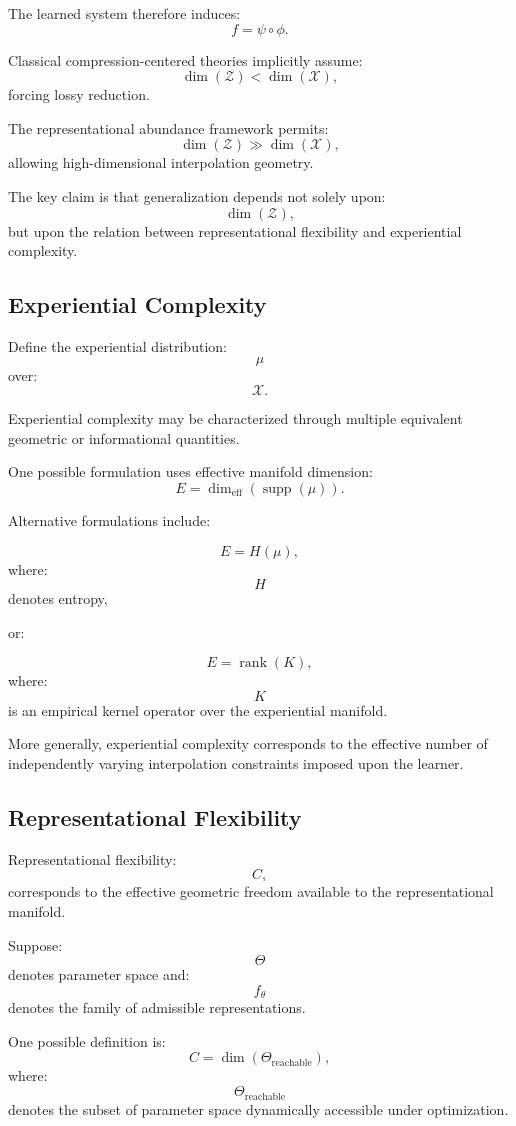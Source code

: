 \documentclass[12pt,a4paper]{article}
\begin{document}
The learned system therefore induces:
\[
f
=
\psi \circ \phi.
\]

Classical compression-centered theories implicitly assume:
\[
\dim(\mathcal{Z})
<
\dim(\mathcal{X}),
\]
forcing lossy reduction.

The representational abundance framework permits:
\[
\dim(\mathcal{Z})
\gg
\dim(\mathcal{X}),
\]
allowing high-dimensional interpolation geometry.

The key claim is that generalization depends not solely upon:
\[
\dim(\mathcal{Z}),
\]
but upon the relation between representational flexibility and experiential complexity.

\subsection{Experiential Complexity}

Define the experiential distribution:
\[
\mu
\]
over:
\[
\mathcal{X}.
\]

Experiential complexity may be characterized through multiple equivalent geometric or informational quantities.

One possible formulation uses effective manifold dimension:
\[
E
=
\dim_{\text{eff}}(\operatorname{supp}(\mu)).
\]

Alternative formulations include:

\[
E
=
H(\mu),
\]
where:
\[
H
\]
denotes entropy,

or:

\[
E
=
\operatorname{rank}(K),
\]
where:
\[
K
\]
is an empirical kernel operator over the experiential manifold.

More generally, experiential complexity corresponds to the effective number of independently varying interpolation constraints imposed upon the learner.

\subsection{Representational Flexibility}

Representational flexibility:
\[
C,
\]
corresponds to the effective geometric freedom available to the representational manifold.

Suppose:
\[
\Theta
\]
denotes parameter space and:
\[
f_\theta
\]
denotes the family of admissible representations.

One possible definition is:
\[
C
=
\dim(\Theta_{\text{reachable}}),
\]
where:
\[
\Theta_{\text{reachable}}
\]
denotes the subset of parameter space dynamically accessible under optimization.
\end{document}
